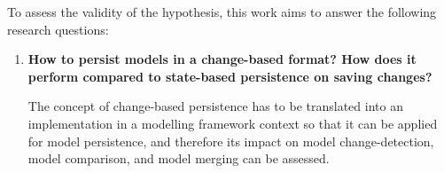 \documentclass[12pt, a4paper]{report} \usepackage[titletoc]{appendix}
\begin{document}
To assess the validity of the hypothesis, this work aims to answer the following research questions: 
\begin{enumerate} 
\item \textbf{How to persist models in a change-based format? How does it perform compared to state-based persistence on saving changes?} 

The concept of change-based persistence has to be translated into an implementation in a modelling framework context so that it can be applied for model persistence, and therefore its impact on model change-detection, model comparison, and model merging can be assessed.

%
%


\end{enumerate}
\end{document}
